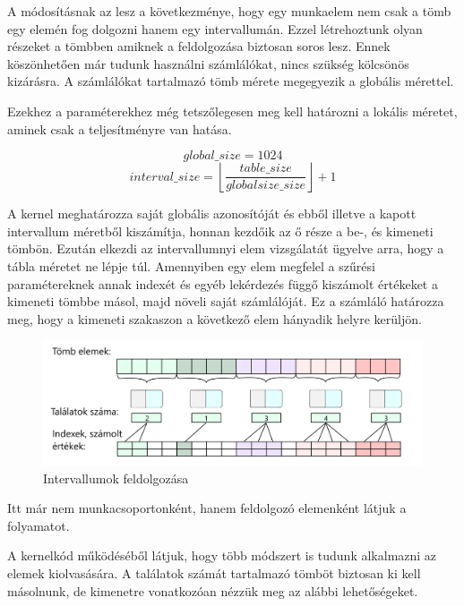 A módosításnak az lesz a következménye, hogy egy munkaelem nem csak a tömb egy elemén fog dolgozni hanem egy intervallumán. Ezzel létrehoztunk olyan részeket a tömbben amiknek a feldolgozása biztosan soros lesz. Ennek köszönhetően már tudunk használni számlálókat, nincs szükség kölcsönös kizárásra. A számlálókat tartalmazó tömb mérete megegyezik a globális mérettel.

Ezekhez a paraméterekhez még tetszőlegesen meg kell határozni a lokális méretet, aminek csak a teljesítményre van hatása.


$$ global\_size = 1024 $$
$$interval\_size =  \left\lfloor \frac{table\_size }{globalsize\_size} \right\rfloor  +1  $$



A kernel meghatározza saját globális azonosítóját és ebből illetve a kapott intervallum méretből kiszámítja, honnan kezdőik az ő része a be-, és kimeneti tömbön. Ezután elkezdi az intervallumnyi elem vizsgálatát ügyelve arra, hogy a tábla méretet ne lépje túl. Amennyiben egy elem megfelel a szűrési paramétereknek annak indexét és egyéb lekérdezés függő kiszámolt értékeket a kimeneti tömbbe másol, majd növeli saját számlálóját. Ez a számláló határozza meg, hogy a kimeneti szakaszon a következő elem hányadik helyre kerüljön.
\begin{figure}[h!]
\centering
\includegraphics[width=\textwidth]{images/itemgroup_black.png}
\caption{Intervallumok feldolgozása}
\label{fig:opencl}
\end{figure}
Itt már nem munkacsoportonként, hanem feldolgozó elemenként látjuk a folyamatot.

\newpage
{}
A kernelkód működéséből látjuk, hogy több módszert is tudunk alkalmazni az elemek kiolvasására. A találatok számát tartalmazó tömböt biztosan ki kell másolnunk, de kimenetre vonatkozóan nézzük meg az alábbi lehetőségeket.

